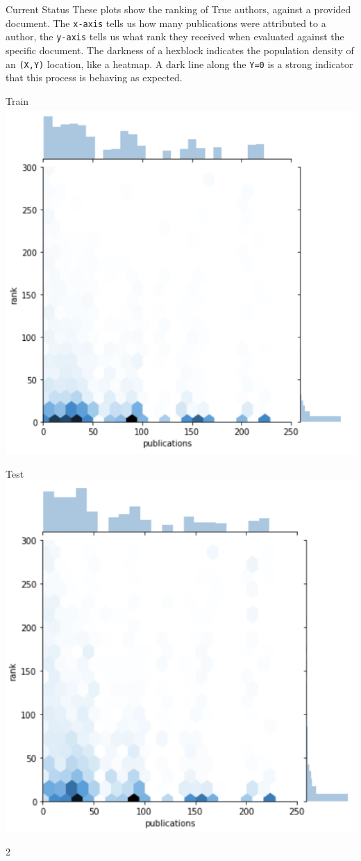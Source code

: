 \documentclass[10pt]{beamer}
\begin{document}
\begin{frame}{Current Status}
  These plots show the ranking of True authors, against a provided document. The \texttt{x-axis} tells us how many publications were attributed to a author, the \texttt{y-axis} tells us what rank they received when evaluated against the specific document. The darkness of a hexblock indicates the population density of an \texttt{(X,Y)} location, like a heatmap. A dark line along the \texttt{Y=0} is a strong indicator that this process is behaving as expected.

  \begin{multicols}{2}
    Train
    \includegraphics[width=.9\columnwidth]{./Train.png}

    Test
  \includegraphics[width=.9\columnwidth]{./Test.png}
  \end{multicols}{2}
\end{frame}
\end{document}
